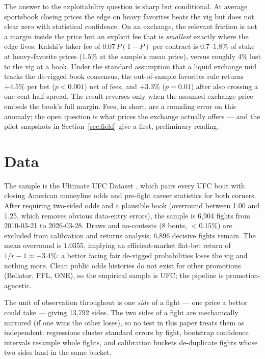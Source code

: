 \documentclass[11pt]{article}
\newcommand{\devig}{de-vigged}
\begin{document}
The answer to the exploitability question is sharp but conditional. At average sportsbook closing
prices the edge on heavy favorites beats the vig but does not clear zero with statistical
confidence. On an exchange, the relevant friction is not a margin inside the price but an explicit
fee that is \emph{smallest} exactly where the edge lives: Kalshi's taker fee of $0.07\,P(1-P)$ per
contract is $0.7$--$1.8\%$ of stake at heavy-favorite prices ($1.5\%$ at the sample's mean
price), versus roughly $4\%$ lost to the vig at a book. Under the standard assumption that a liquid exchange mid tracks the \devig{} book
consensus, the out-of-sample favorites rule returns $+4.5\%$ per bet ($p<0.001$) net of fees, and
$+3.3\%$ ($p=0.01$) after also crossing a one-cent half-spread. The result reverses only when the
assumed exchange price embeds the book's full margin. Fees, in short, are a rounding error on this
anomaly; the open question is what prices the exchange actually offers --- and the pilot snapshots
in Section~\ref{sec:field} give a first, preliminary reading.

\section{Data}

The sample is the Ultimate UFC Dataset \citep{ufcdata}, which pairs every UFC bout with closing
American moneyline odds and pre-fight career statistics for both corners. After requiring
two-sided odds and a plausible book (overround between 1.00 and 1.25, which removes obvious
data-entry errors), the sample is 6{,}904 fights from 2010-03-21 to 2026-03-28. Draws and
no-contests (8 bouts, $<0.15\%$) are excluded from calibration and returns analysis; 6{,}896
decisive fights remain. The mean overround is $1.0355$, implying an efficient-market flat-bet
return of $1/r - 1 \approx -3.4\%$: a bettor facing fair \devig{} probabilities loses the vig and
nothing more. Clean public odds histories do not exist for other promotions (Bellator, PFL, ONE),
so the empirical sample is UFC; the pipeline is promotion-agnostic.

The unit of observation throughout is one \emph{side} of a fight --- one price a bettor could take
--- giving 13{,}792 sides. The two sides of a fight are mechanically mirrored (if one wins the
other loses), so no test in this paper treats them as independent: regressions cluster standard
errors by fight, bootstrap confidence intervals resample whole fights, and calibration buckets
de-duplicate fights whose two sides land in the same bucket.
\end{document}
